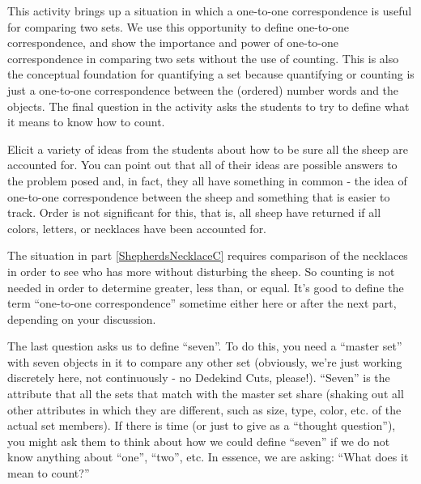 \documentclass{ximera}
\begin{document}
\newpage
\begin{instructorNotes}

This activity brings up a situation in which a one-to-one correspondence is useful for comparing two sets.  We use this opportunity to define one-to-one correspondence, and show the importance and power of one-to-one correspondence in comparing two sets without the use of counting.  This is also the conceptual foundation for quantifying a set because quantifying or counting is just a one-to-one correspondence between the (ordered) number words and the objects.  The final question in the activity asks the students to try to define what it means to know how to count. 


Elicit a variety of ideas from the students about how to be sure all the sheep are accounted for.  You can point out that all of their ideas are possible answers to the problem posed and, in fact, they all have something in common - the idea of one-to-one correspondence between the sheep and something that is easier to track.  Order is not significant for this, that is, all sheep have returned if all colors, letters, or necklaces have been accounted for.


The situation in part \ref{ShepherdsNecklaceC} requires comparison of the necklaces in order to see who has more without disturbing the sheep.  So counting is not needed in order to determine greater, less than, or equal. It's good to define the term ``one-to-one correspondence'' sometime either here or after the next part, depending on your discussion.



The last question asks us to define ``seven''. To do this, you need a ``master set'' with seven objects in it to compare any other set (obviously, we're just working discretely here, not continuously - no Dedekind Cuts, please!).  ``Seven'' is the attribute that all the sets that match with the master set share (shaking out all other attributes in which they are different, such as size, type, color, etc. of the actual set members).  If there is time (or just to give as a ``thought question''), you might ask them to think about how we could define ``seven'' if we do not know anything about ``one'', ``two'', etc.  In essence, we are asking: ``What does it mean to count?''


\end{instructorNotes}
\end{document}
